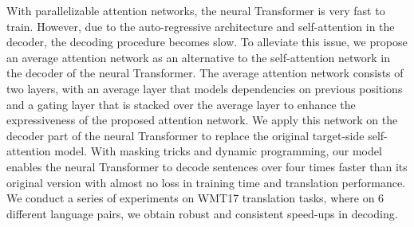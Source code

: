 With parallelizable attention networks, the neural Transformer is very fast to train. However, due to the auto-regressive architecture and self-attention in the decoder, the decoding procedure becomes slow. To alleviate this issue, we propose an average attention network as an alternative to the self-attention network in the decoder of the neural Transformer. The average attention network consists of two layers, with an average layer that models dependencies on previous positions and a gating layer that is stacked over the average layer to enhance the expressiveness of the proposed attention network. We apply this network on the decoder part of the neural Transformer to replace the original target-side self-attention model. With masking tricks and dynamic programming, our model enables the neural Transformer to decode sentences over four times faster than its original version with almost no loss in training time and translation performance. We conduct a series of experiments on WMT17 translation tasks, where on 6 different language pairs, we obtain robust and consistent speed-ups in decoding.
